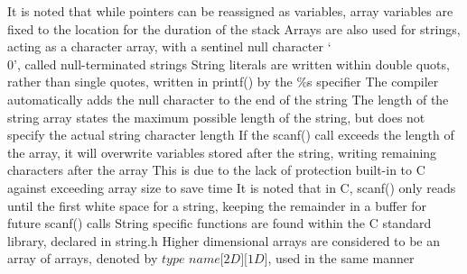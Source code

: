 \documentclass[11 pt, twoside]{article}
\newenvironment{outline*}
{
	\begin{outline}[enumerate]
	}
	{\end{outline}
}
\begin{document}
\begin{outline*}
\4 It is noted that while pointers can be reassigned as variables, array variables are fixed to the location for the duration of the stack
\2 Arrays are also used for strings, acting as a character array, with a sentinel null character `\\0', called null-terminated strings
\3 String literals are written within double quots, rather than single quotes, written in printf() by the \%s specifier
\3 The compiler automatically adds the null character to the end of the string
\3 The length of the string array states the maximum possible length of the string, but does not specify the actual string character length
\4 If the scanf() call exceeds the length of the array, it will overwrite variables stored after the string, writing remaining characters after the array
\4 This is due to the lack of protection built-in to C against exceeding array size to save time
\3 It is noted that in C, scanf() only reads until the first white space for a string, keeping the remainder in a buffer for future scanf() calls
\3 String specific functions are found within the C standard library, declared in string.h
\1 Higher dimensional arrays are considered to be an array of arrays, denoted by $\textit{type name[2D][1D]}$, used in the same manner
\end{outline*}
\end{document}

